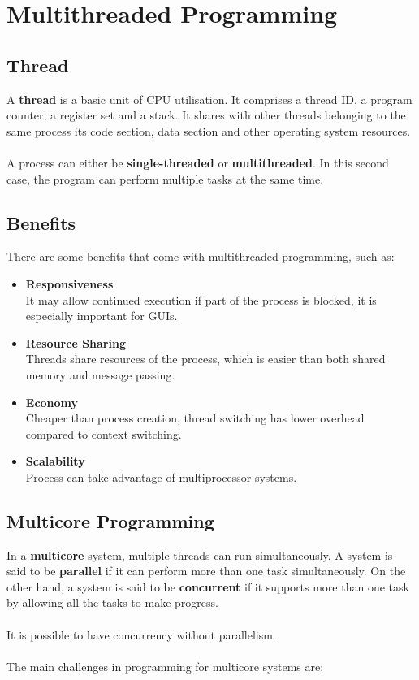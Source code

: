 \documentclass{article}
\begin{document}
\section{Multithreaded Programming}
\subsection{Thread}
A \textbf{thread} is a basic unit of CPU utilisation. It comprises a thread ID, a program counter, a register set and a stack. It shares with other threads belonging to the same process its code section, data section and other operating system resources. \\ \\
A process can either be \textbf{single-threaded} or \textbf{multithreaded}. In this second case, the program can perform multiple tasks at the same time.

\subsection{Benefits}
There are some benefits that come with multithreaded programming, such as:

\begin{itemize}
	\item \textbf{Responsiveness}
	\vspace{.2cm} \\
	It may allow continued execution if part of the process is blocked, it is especially important for GUIs.
	
	\item \textbf{Resource Sharing}
	\vspace{.2cm} \\
	Threads share resources of the process, which is easier than both shared memory and message passing.
	
	\item \textbf{Economy}
	\vspace{.2cm} \\
	Cheaper than process creation, thread switching has lower overhead compared to context switching.
	
	\item \textbf{Scalability}
	\vspace{.2cm} \\
	Process can take advantage of multiprocessor systems.
\end{itemize}

\subsection{Multicore Programming}
In a \textbf{multicore} system, multiple threads can run simultaneously. A system is said to be \textbf{parallel} if it can perform more than one task simultaneously. On the other hand, a system is said to be \textbf{concurrent} if it supports more than one task by allowing all the tasks to make progress. \\ \\
It is possible to have concurrency without parallelism. \\ \\
The main challenges in programming for multicore systems are:
\end{document}
